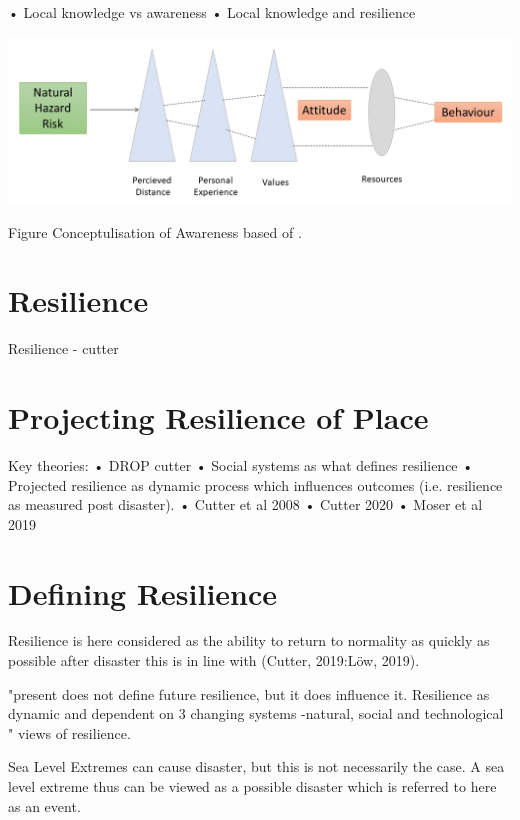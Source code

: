 \documentclass{article}
\begin{document}
•	Local knowledge vs awareness
•	Local knowledge and resilience 

\includegraphics[width=1\textwidth]{fig_theory/awareness lujala and whitmarsh.png}

\begin{frame}{Figure Conceptulisation of Awareness based of \cite{lujala_climate_2015}\cite{whitmarsh_are_2008}.}
\end{frame}

\section{Resilience}
Resilience - cutter

\section{Projecting Resilience of Place}
Key theories:
•	DROP cutter
•	Social systems as what defines resilience
•	Projected resilience as dynamic process which influences outcomes (i.e. resilience as measured post disaster). 
•	Cutter et al 2008
•	Cutter 2020 
•	Moser et al 2019 

\section{Defining Resilience} 
Resilience is here considered as the ability to return to normality as quickly as possible after disaster this is in line with (Cutter, 2019:Löw, 2019).

"present does not define future resilience, but it does influence it. Resilience as dynamic and dependent on 3 changing systems -natural, social and technological
" \cite{cutter_community_2020} views of resilience.

Sea Level Extremes can cause disaster, but this is not necessarily the case. A sea level extreme thus can be viewed as a possible disaster which is referred to here as an event. 
\end{document}
